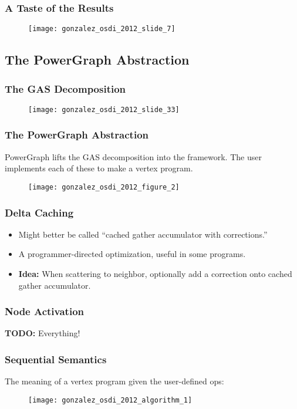 \begin{frame}
  \frametitle{A Taste of the Results}
  \begin{figure}
    \centering
    \texttt{[image: gonzalez\_osdi\_2012\_slide\_7]}
    \caption{\cite[OSDI '12 Slides]{gonzalez2012powergraph-slides}}
  \end{figure}
\end{frame}


\subsection{The PowerGraph Abstraction}

\begin{frame}
  \frametitle{The GAS Decomposition}
  \begin{figure}
    \centering
    \texttt{[image: gonzalez\_osdi\_2012\_slide\_33]}
    \caption{\cite[OSDI '12 Slides]{gonzalez2012powergraph-slides}}
  \end{figure}
\end{frame}

\begin{frame}
  \frametitle{The PowerGraph Abstraction}
  PowerGraph lifts the GAS decomposition into the framework. The user implements
  each of these to make a vertex program.
  \begin{figure}
    \centering
    \texttt{[image: gonzalez\_osdi\_2012\_figure\_2]}
    \caption{\cite[OSDI '12]{gonzalez2012powergraph}}
  \end{figure}
\end{frame}

\begin{frame}
  \frametitle{Delta Caching}
  \begin{itemize}
    \item Might better be called ``cached gather accumulator with corrections.''
    \item A programmer-directed optimization, useful in some programs.
    \item \textbf{Idea:} When scattering to neighbor, optionally add a
          correction onto cached gather accumulator.
  \end{itemize}
\end{frame}

\begin{frame}
  \frametitle{Node Activation}
  \textbf{TODO:} Everything!
\end{frame}

\begin{frame}
  \frametitle{Sequential Semantics}
  The meaning of a vertex program given the user-defined ops:
  \begin{figure}
    \centering
    \texttt{[image: gonzalez\_osdi\_2012\_algorithm\_1]}
    \caption{\cite[OSDI '12]{gonzalez2012powergraph}}
  \end{figure}
\end{frame}

